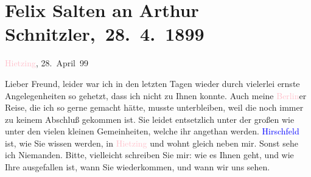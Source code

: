 

\renewcommand{\erwaehntePersonen}{Personen: Georg Hirschfeld, Ottilie Salten}
\renewcommand{\erwaehnteInstitutionen}{Institutionen: Deutsches Theater Berlin}
\renewcommand{\erwaehnteOrte}{Orte: Berlin, Pötzleinsdorf, Wien, XIII., Hietzing}
\renewcommand{\erwaehnteWerke}{Werke: Der grüne Kakadu – Paracelsus – Die Gefährtin. Drei Einakter}
\section[ Felix Salten an Arthur Schnitzler, 28. 4. 1899]{Felix Salten an Arthur Schnitzler, 28. 4. 1899}
\nopagebreak{}
\rehead{ }\normalsize\beginnumbering{}
\toendnotes[C]{\smallbreak\pagebreak[2]}
\toendnotes[C]{\smallbreak}
\pstart
           \raggedleft{}{\pb}\textcolor{pink}{Hietzing}{}\ledrightnote{\textcolor{pink}{XIII., Hietzing}}, 28. April 99\pend
           
\pstart
           Lieber Freund, leider war ich in den letzten Tagen wieder durch
               vielerlei ernste Angelegenheiten so gehetzt, dass ich nicht zu Ihnen konnte. Auch
               meine \textcolor{pink}{Berlin}{}\ledrightnote{\textcolor{pink}{Berlin}}er Reise, die ich so gerne gemacht
               hätte, musste unterbleiben, weil die \label{K_L03288-1v}\label{K_L03288-1h} noch immer zu keinem
               Abschluß gekommen ist. Sie leidet entsetzlich unter der großen wie unter den vielen
               kleinen Gemeinheiten, welche ihr angethan werden. \textcolor{blue}{Hirschfeld}{}\ledrightnote{\textcolor{blue}{Georg Hirschfeld}} ist, wie Sie wissen werden, in \textcolor{pink}{Hietzing}{}\ledrightnote{\textcolor{pink}{XIII., Hietzing}} und wohnt gleich neben mir. Sonst sehe ich Niemanden. Bitte,
               vielleicht schreiben Sie mir: wie es Ihnen geht, und wie Ihre \label{K_L03288-2v}\label{K_L03288-2h} ausgefallen ist, wann Sie wiederkommen, und wann wir uns sehen.\pend
           
